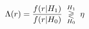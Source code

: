 \documentclass[preview]{standalone}
\begin{document}
\begin{align*}
\special{dvisvgm:raw <g id='unique000'>}\Lambda(r)=\frac{f(r|H_1)}{f(r|H_0)}\;\underset{H_0}{\overset{H_1}{\gtrless}}\;\eta\special{dvisvgm:raw </g>}
\end{align*}
\end{document}
